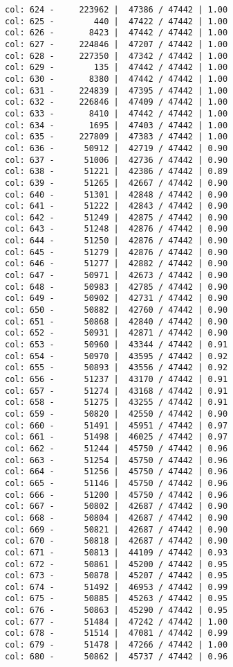 \documentclass[11pt]{article}
\begin{document}
\begin{Verbatim}[commandchars=\\\{\}]
col: 624 -     223962 |  47386 / 47442 | 1.00
col: 625 -        440 |  47422 / 47442 | 1.00
col: 626 -       8423 |  47442 / 47442 | 1.00
col: 627 -     224846 |  47207 / 47442 | 1.00
col: 628 -     227350 |  47342 / 47442 | 1.00
col: 629 -        135 |  47442 / 47442 | 1.00
col: 630 -       8380 |  47442 / 47442 | 1.00
col: 631 -     224839 |  47395 / 47442 | 1.00
col: 632 -     226846 |  47409 / 47442 | 1.00
col: 633 -       8410 |  47442 / 47442 | 1.00
col: 634 -       1695 |  47403 / 47442 | 1.00
col: 635 -     227809 |  47383 / 47442 | 1.00
col: 636 -      50912 |  42719 / 47442 | 0.90
col: 637 -      51006 |  42736 / 47442 | 0.90
col: 638 -      51221 |  42386 / 47442 | 0.89
col: 639 -      51265 |  42667 / 47442 | 0.90
col: 640 -      51301 |  42848 / 47442 | 0.90
col: 641 -      51222 |  42843 / 47442 | 0.90
col: 642 -      51249 |  42875 / 47442 | 0.90
col: 643 -      51248 |  42876 / 47442 | 0.90
col: 644 -      51250 |  42876 / 47442 | 0.90
col: 645 -      51279 |  42876 / 47442 | 0.90
col: 646 -      51277 |  42882 / 47442 | 0.90
col: 647 -      50971 |  42673 / 47442 | 0.90
col: 648 -      50983 |  42785 / 47442 | 0.90
col: 649 -      50902 |  42731 / 47442 | 0.90
col: 650 -      50882 |  42760 / 47442 | 0.90
col: 651 -      50868 |  42840 / 47442 | 0.90
col: 652 -      50931 |  42871 / 47442 | 0.90
col: 653 -      50960 |  43344 / 47442 | 0.91
col: 654 -      50970 |  43595 / 47442 | 0.92
col: 655 -      50893 |  43556 / 47442 | 0.92
col: 656 -      51237 |  43170 / 47442 | 0.91
col: 657 -      51274 |  43168 / 47442 | 0.91
col: 658 -      51275 |  43255 / 47442 | 0.91
col: 659 -      50820 |  42550 / 47442 | 0.90
col: 660 -      51491 |  45951 / 47442 | 0.97
col: 661 -      51498 |  46025 / 47442 | 0.97
col: 662 -      51244 |  45750 / 47442 | 0.96
col: 663 -      51254 |  45750 / 47442 | 0.96
col: 664 -      51256 |  45750 / 47442 | 0.96
col: 665 -      51146 |  45750 / 47442 | 0.96
col: 666 -      51200 |  45750 / 47442 | 0.96
col: 667 -      50802 |  42687 / 47442 | 0.90
col: 668 -      50804 |  42687 / 47442 | 0.90
col: 669 -      50821 |  42687 / 47442 | 0.90
col: 670 -      50818 |  42687 / 47442 | 0.90
col: 671 -      50813 |  44109 / 47442 | 0.93
col: 672 -      50861 |  45200 / 47442 | 0.95
col: 673 -      50878 |  45207 / 47442 | 0.95
col: 674 -      51492 |  46953 / 47442 | 0.99
col: 675 -      50885 |  45263 / 47442 | 0.95
col: 676 -      50863 |  45290 / 47442 | 0.95
col: 677 -      51484 |  47242 / 47442 | 1.00
col: 678 -      51514 |  47081 / 47442 | 0.99
col: 679 -      51478 |  47266 / 47442 | 1.00
col: 680 -      50862 |  45737 / 47442 | 0.96

\end{Verbatim}
\end{document}
